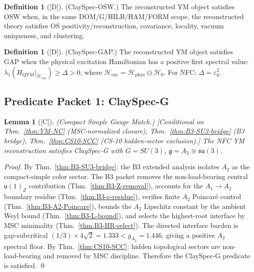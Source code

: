 \documentclass[12pt,oneside]{amsbook}
\theoremstyle{plain}
\newtheorem{lemma}[theorem]{Lemma}
\theoremstyle{definition}
\newtheorem{definition}[theorem]{Definition}
\theoremstyle{remark}
\newcommand{\status}[1]{\textup{[#1]}}
\begin{document}
\begin{definition}[\status{D}]\label{def:ClaySpec-OSW-predicate}
\textup{(ClaySpec-OSW.)}
The reconstructed YM object satisfies OSW when, in the same
DOM/G/HILB/HAM/FORM scope, the reconstructed theory satisfies OS
positivity/reconstruction, covariance, locality, vacuum uniqueness,
and clustering.
\end{definition}

\begin{definition}[\status{D}]\label{def:ClaySpec-GAP-predicate}
\textup{(ClaySpec-GAP.)}
The reconstructed YM object satisfies GAP when the physical excitation
Hamiltonian has a positive first spectral value:
$\lambda_1(H_{\mathrm{QYM}}|_{\mathcal{H}_{\mathrm{exc}}})\ge\Delta>0$,
where $\mathcal{H}_{\mathrm{exc}}=\mathcal{H}_{\mathrm{phys}}\ominus\mathcal{H}_0$.
For NFC: $\Delta=\varepsilon_0^2$.
\end{definition}

\subsection{Predicate Packet 1: ClaySpec-G}

\begin{lemma}[\status{C}]\label{lem:ClaySpec-G-A2}
\textup{(Compact Simple Gauge Match.)}
\textup{[Conditional on Thm.~\ref{thm:YM-NC} (MSC-normalized closure),
Thm.~\ref{thm:B3-SU3-bridge} (B3 bridge), Thm.~\ref{thm:CS10-SCC}
(CS-10 hidden-sector exclusion).]}
The NFC YM reconstruction satisfies ClaySpec-G with $G=SU(3)$,
$\mathfrak{g}=A_2\cong\mathfrak{su}(3)$.
\end{lemma}

\begin{proof}
By Thm.~\ref{thm:B3-SU3-bridge}: the B3 extended analysis isolates
$A_2$ as the compact-simple color sector. The B3 packet removes the
non-load-bearing central $\mathfrak{u}(1)_Z$ contribution
(Thm.~\ref{thm:B3-Z-removal}), accounts for the $A_1\to A_2$
boundary residue (Thm.~\ref{thm:B3-c-residue}), verifies finite $A_2$
Poincar\'e control (Thm.~\ref{thm:B3-A2-Poincare}), bounds the
$A_2$ Lipschitz constant by the ambient Weyl bound
(Thm.~\ref{thm:B3-L-bound}), and selects the highest-root interface
by MSC minimality (Thm.~\ref{thm:B3-HR-select}). The directed
interface burden is gap-subcritical
$(1/3)\times 4\sqrt{2}=1.333 < g_{A_2}=1.446$, giving a positive
$A_2$ spectral floor.
By Thm.~\ref{thm:CS10-SCC}: hidden topological sectors are
non-load-bearing and removed by MSC discipline.
Therefore the ClaySpec-G predicate is satisfied.
\qed
\end{proof}
\end{document}
